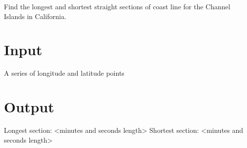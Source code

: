 

Find the longest and shortest straight sections of coast line 
for the Channel Islands in California.

\section*{Input}

A series of longitude and latitude points

\section*{Output}

Longest section: <minutes and seconds length>
Shortest section: <minutes and seconds length>


